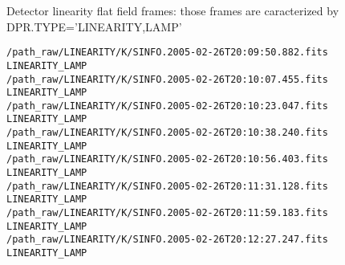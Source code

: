 Detector linearity flat field frames: those frames are caracterized 
by DPR.TYPE='LINEARITY,LAMP'

\begin{verbatim}
/path_raw/LINEARITY/K/SINFO.2005-02-26T20:09:50.882.fits LINEARITY_LAMP
/path_raw/LINEARITY/K/SINFO.2005-02-26T20:10:07.455.fits LINEARITY_LAMP
/path_raw/LINEARITY/K/SINFO.2005-02-26T20:10:23.047.fits LINEARITY_LAMP
/path_raw/LINEARITY/K/SINFO.2005-02-26T20:10:38.240.fits LINEARITY_LAMP
/path_raw/LINEARITY/K/SINFO.2005-02-26T20:10:56.403.fits LINEARITY_LAMP
/path_raw/LINEARITY/K/SINFO.2005-02-26T20:11:31.128.fits LINEARITY_LAMP
/path_raw/LINEARITY/K/SINFO.2005-02-26T20:11:59.183.fits LINEARITY_LAMP
/path_raw/LINEARITY/K/SINFO.2005-02-26T20:12:27.247.fits LINEARITY_LAMP
\end{verbatim}



